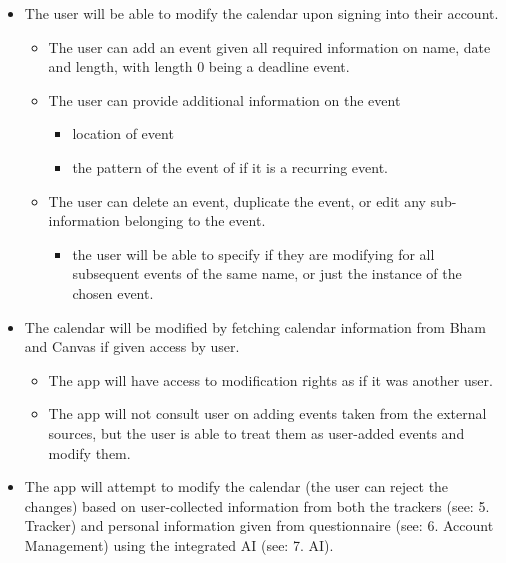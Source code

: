 \documentclass[a4paper,11pt]{article} %
\begin{document}
\begin{itemize}
 
\item
  The user will be able to modify the calendar upon signing into their
  account.

  \begin{itemize}
   
  \item
    The user can add an event given all required information on name,
    date and length, with length 0 being a deadline event.
  \item
    The user can provide additional information on the event

    \begin{itemize}
     
    \item
      location of event
    \item
      the pattern of the event of if it is a recurring event.
    \end{itemize}
  \item
    The user can delete an event, duplicate the event, or edit any
    sub-information belonging to the event.

    \begin{itemize}
     
    \item
      the user will be able to specify if they are modifying for all
      subsequent events of the same name, or just the instance of the
      chosen event.
    \end{itemize}
  \end{itemize}
\item
  The calendar will be modified by fetching calendar information from
  Bham and Canvas if given access by user.

  \begin{itemize}
   
  \item
    The app will have access to modification rights as if it was another
    user.
  \item
    The app will not consult user on adding events taken from the
    external sources, but the user is able to treat them as user-added
    events and modify them.
  \end{itemize}
\item
  The app will attempt to modify the calendar (the user can reject the
  changes) based on user-collected information from both the trackers
  (see: 5. Tracker) and personal information given from questionnaire
  (see: 6. Account Management) using the integrated AI (see: 7. AI).


\end{itemize}
\end{document}
